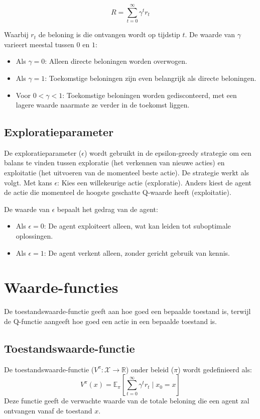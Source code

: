 \documentclass[a4paper,12pt]{report}
\begin{document}
\begin{equation}
    R = \sum_{t=0}^\infty \gamma^t r_t
\end{equation}

Waarbij \(r_t\) de beloning is die ontvangen wordt op tijdstip \(t\). De waarde
van \(\gamma\) varieert meestal tussen \(0\) en \(1\):
\begin{itemize}
    \item Als \(\gamma = 0\): Alleen directe beloningen worden overwogen.
    \item Als \(\gamma = 1\): Toekomstige beloningen zijn even belangrijk als directe
          beloningen.
    \item Voor \(0 < \gamma < 1\): Toekomstige beloningen worden gedisconteerd, met een
          lagere waarde naarmate ze verder in de toekomst liggen.
\end{itemize}

\subsection{Exploratieparameter}

De exploratieparameter (\(\epsilon\)) wordt gebruikt in de epsilon-greedy
strategie om een balans te vinden tussen exploratie (het verkennen van nieuwe
acties) en exploitatie (het uitvoeren van de momenteel beste actie). De
strategie werkt als volgt. Met kans \(\epsilon\): Kies een willekeurige actie
(exploratie). Anders kiest de agent de actie die momenteel de hoogste geschatte
Q-waarde heeft (exploitatie).

De waarde van \(\epsilon\) bepaalt het gedrag van de agent:
\begin{itemize}
    \item Als \(\epsilon = 0\): De agent exploiteert alleen, wat kan leiden tot
          suboptimale oplossingen.
    \item Als \(\epsilon = 1\): De agent verkent alleen, zonder gericht gebruik van
          kennis.
\end{itemize}

\section{Waarde-functies}
De toestandswaarde-functie geeft aan hoe goed een bepaalde toestand is, terwijl
de Q-functie aangeeft hoe goed een actie in een bepaalde toestand is.
\subsection{Toestandswaarde-functie}
De toestandswaarde-functie (\(V^\pi: \mathcal{X} \to \mathbb{R}\)) onder beleid
(\(\pi\)) wordt gedefinieerd als:
\begin{equation}
    V^\pi(x) = \mathbb{E}_\pi\left[\sum_{t=0}^\infty \gamma^t r_t \mid x_0 = x\right]
\end{equation}
Deze functie geeft de verwachte waarde van de totale beloning die een agent zal
ontvangen vanaf de toestand \(x\).
\end{document}
